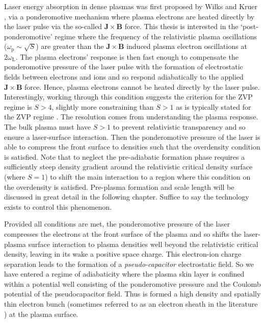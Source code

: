 Laser energy absorption in dense plasmas was first proposed by Wilks and Kruer \cite{wilksAbsorptionUltraIntenseLaser1992}, via a ponderomotive mechanism where plasma electrons are heated directly by the laser pulse via the so-called $\mathbf{J}\times \mathbf{B}$ force. This thesis is interested in the `post-ponderomotive' regime where the frequency of the relativistic plasma oscillations ($\omega_\mathrm{p} \sim \sqrt{S}$) are greater than the $\mathbf{J}\times \mathbf{B}$ induced plasma electron oscillations at $2\omega_\mathrm{L}$. The plasma electrons' response is then fast enough to compensate the ponderomotive pressure of the laser pulse with the formation of electrostatic fields between electrons and ions and so respond adiabatically to the applied $\mathbf{J}\times \mathbf{B}$ force. Hence, plasma electrons cannot be heated directly by the laser pulse. Interestingly, working through this condition suggests the criterion for the \ac{ZVP} regime is $S > 4$, slightly more constraining than $S>1$ as is typically stated for the \ac{ZVP} regime \cite{savinModellingLaserPlasmaInteractions2019}. The resolution comes from understanding the plasma response. The bulk plasma must have $S>1$ to prevent relativistic transparency and so ensure a laser-surface interaction. Then the ponderomotive pressure of the laser is able to compress the front surface to densities such that the overdensity condition is satisfied. Note that to neglect the pre-adiabatic formation phase requires a sufficiently steep density gradient around the relativistic critical density surface (where $S=1$) to shift the main interaction to a region where this condition on the overdensity is satisfied. Pre-plasma formation and scale length will be discussed in great detail in the following chapter. Suffice to say the technology exists to control this phenomenon. 

Provided all conditions are met, the ponderomotive pressure of the laser compresses the electrons at the front surface of the plasma and so shifts the laser-plasma surface interaction to plasma densities well beyond the relativistic critical density, leaving in its wake a positive space charge. This electron-ion charge separation leads to the formation of a \textit{pseudo-capacitor} electrostatic field. So we have entered a regime of adiabaticity where the plasma skin layer is confined within a potential well consisting of the ponderomotive pressure and the Coulomb potential of the pseudocapacitor field. Thus is formed a high density and spatially thin electron bunch (sometimes referred to as an electron sheath in the literature \cite{gonoskovUltrarelativisticNanoplasmonicsRoute2011}) at the plasma surface.

